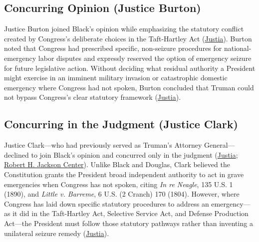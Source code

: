 \documentclass[12pt]{article}
\begin{document}
\subsection{Concurring Opinion (Justice Burton)}
Justice Burton joined Black's opinion while emphasizing the statutory conflict created by Congress's deliberate choices in the Taft-Hartley Act (\href{https://supreme.justia.com/cases/federal/us/343/579/}{Justia}). Burton noted that Congress had prescribed specific, non-seizure procedures for national-emergency labor disputes and expressly reserved the option of emergency seizure for future legislative action. Without deciding what residual authority a President might exercise in an imminent military invasion or catastrophic domestic emergency where Congress had not spoken, Burton concluded that Truman could not bypass Congress's clear statutory framework (\href{https://supreme.justia.com/cases/federal/us/343/579/}{Justia}).

\subsection{Concurring in the Judgment (Justice Clark)}
Justice Clark---who had previously served as Truman's Attorney General---declined to join Black's opinion and concurred only in the judgment (\href{https://supreme.justia.com/cases/federal/us/343/579/}{Justia}; \href{https://www.roberthjackson.org/wp-content/uploads/migrated-files/article-calendar-files/korman_primer.pdf}{Robert H. Jackson Center}). Unlike Black and Douglas, Clark believed the Constitution grants the President broad independent authority to act in grave emergencies when Congress has not spoken, citing \textit{In re Neagle}, 135 U.S. 1 (1890), and \textit{Little v. Barreme}, 6 U.S. (2 Cranch) 170 (1804). However, where Congress has laid down specific statutory procedures to address an emergency---as it did in the Taft-Hartley Act, Selective Service Act, and Defense Production Act---the President must follow those statutory pathways rather than inventing a unilateral seizure remedy (\href{https://supreme.justia.com/cases/federal/us/343/579/}{Justia}).
\end{document}
